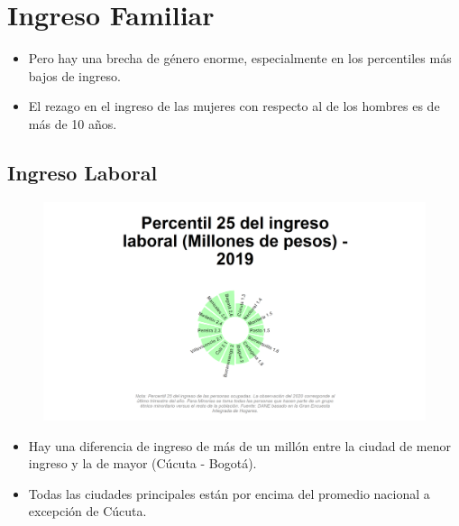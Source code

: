 


\section{Ingreso Familiar}

            \begin{itemize}
                    \item Pero hay una brecha de género enorme, especialmente en los percentiles más bajos de ingreso.
                    \item El rezago en el ingreso de las mujeres con respecto al de los hombres es de más de 10 años.
                \end{itemize}
    
    \subsection{Ingreso Laboral}
    \begin{figure}[H]
    \caption[Percentil 25 del ingreso laboral por ciudades principales - 2019]{\label{map_result_2}}
        \begin{center}
        \includegraphics[width=\textwidth,keepaspectratio]{img/var_2_static.png}
        \end{center}
    \end{figure}
            \begin{itemize}
                    \item Hay una diferencia de ingreso de más de un millón entre la ciudad de menor ingreso y la de mayor (Cúcuta -  Bogotá).
                    \item Todas las ciudades principales están por encima del promedio nacional a excepción de Cúcuta.
                \end{itemize}

